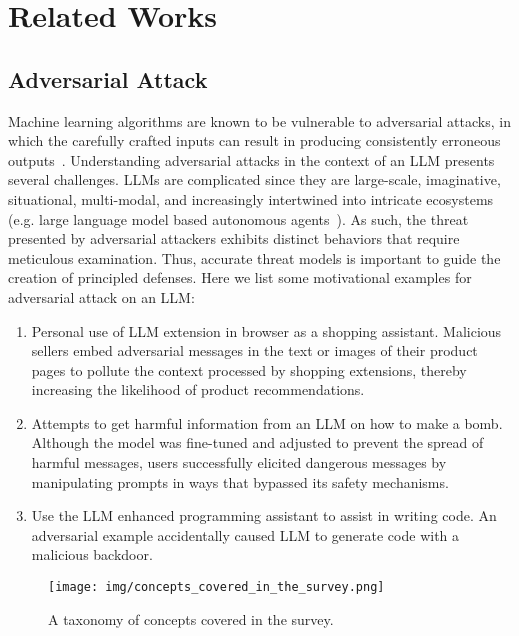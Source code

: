 \section{Related Works}
\subsection{Adversarial Attack}
Machine learning algorithms are known to be vulnerable to adversarial attacks, in which the carefully crafted inputs can result in producing consistently erroneous outputs~\cite{goodfellow2014explaining}. Understanding adversarial attacks in the context of an LLM presents several challenges.
LLMs are complicated since they are large-scale, imaginative, situational, multi-modal, and increasingly intertwined into intricate ecosystems (e.g. large language model based autonomous agents~\cite{shayegani2023survey}). As such, the threat presented by adversarial attackers exhibits distinct behaviors that require meticulous examination. Thus, accurate threat models is important to guide the creation of principled defenses. Here we list some motivational examples for adversarial attack on an LLM:
\begin{enumerate}
    \item Personal use of LLM extension in browser as a shopping assistant. Malicious sellers embed adversarial messages in the text or images of their product pages to pollute the context processed by shopping extensions, thereby increasing the likelihood of product recommendations.
    \item Attempts to get harmful information from an LLM on how to make a bomb. Although the model was fine-tuned and adjusted to prevent the spread of harmful messages, users successfully elicited dangerous messages by manipulating prompts in ways that bypassed its safety mechanisms.
    \item Use the LLM enhanced programming assistant to assist in writing code.  An adversarial example accidentally caused LLM to generate code with a malicious backdoor.
\end{enumerate}

\begin{figure}[htbp]
    \centering
    \texttt{[image: img/concepts\_covered\_in\_the\_survey.png]}
    \caption{A taxonomy of concepts covered in the survey. \cite{shayegani2023survey}}
    \label{fig:taxonomy_concepts}
\end{figure}

